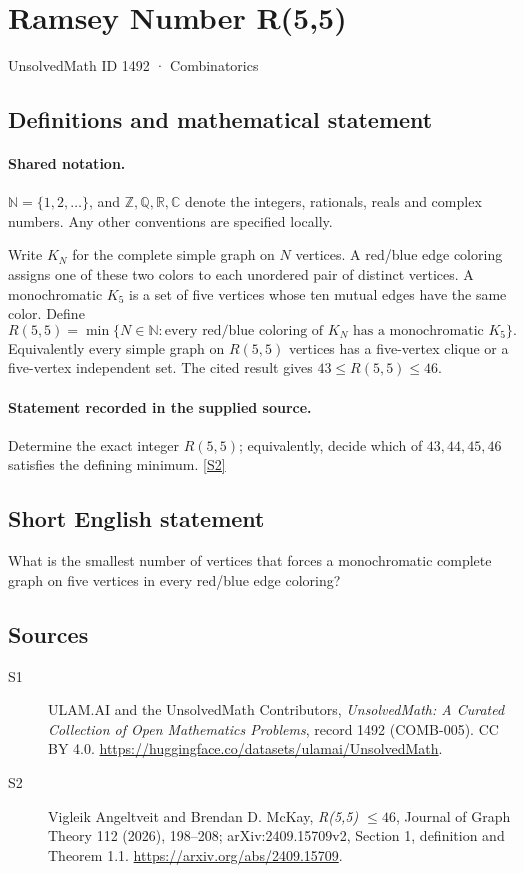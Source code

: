 \documentclass[11pt]{article}
\newcommand{\sref}[2]{\hyperlink{source:#1:#2}{[S#2]}}
\begin{document}
\setcounter{section}{1491}
\section{Ramsey Number R(5,5)}\label{1492}
{\small\sffamily UnsolvedMath ID 1492 · Combinatorics}
\subsection{Definitions and mathematical statement}

\paragraph{Shared notation.}$\mathbb N=\{1,2,\ldots\}$, and $\mathbb Z,\mathbb Q,\mathbb R,\mathbb C$ denote the integers, rationals, reals and complex numbers. Any other conventions are specified locally.


Write \(K_N\) for the complete simple graph on \(N\) vertices.
A red/blue edge coloring assigns one of these two colors to each
unordered pair of distinct vertices. A monochromatic \(K_5\)
is a set of five vertices whose ten mutual edges have the same color.
Define
\[
 R(5,5)=\min\{N\in\mathbb N:\text{every red/blue coloring of }K_N
                          \text{ has a monochromatic }K_5\}.
\]
Equivalently every simple graph on \(R(5,5)\) vertices has a
five-vertex clique or a five-vertex independent set.
The cited result gives \(43\le R(5,5)\le46\).
\paragraph{Statement recorded in the supplied source.}
Determine the exact integer \(R(5,5)\); equivalently, decide
which of \(43,44,45,46\) satisfies the defining minimum. \sref{1492}{2}
\subsection{Short English statement}
What is the smallest number of vertices that forces a monochromatic complete graph on five vertices in every red/blue edge coloring?
\subsection{Sources}
\begin{description}
\item[\hypertarget{source:1492:1}{S1}] ULAM.AI and the UnsolvedMath Contributors, \emph{UnsolvedMath: A Curated Collection of Open Mathematics Problems}, record 1492 (COMB-005). CC BY 4.0. \url{https://huggingface.co/datasets/ulamai/UnsolvedMath}.
\item[\hypertarget{source:1492:2}{S2}] Vigleik Angeltveit and Brendan D. McKay, \emph{R(5,5) $\le46$}, Journal of Graph Theory 112 (2026), 198--208; arXiv:2409.15709v2, Section 1, definition and Theorem 1.1. \url{https://arxiv.org/abs/2409.15709}.
\end{description}
\label{end:1492}
\end{document}
